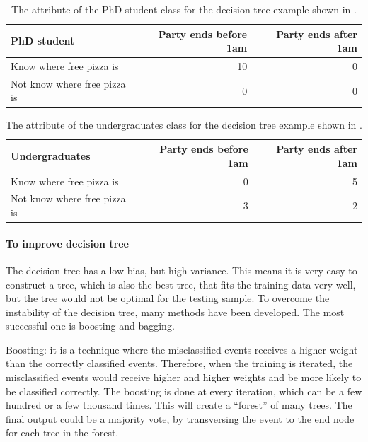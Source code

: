 \begin{table}[!tbp]\centering

\begin{tabular}{lrr}
\hline \hline
PhD student & Party ends before 1am  & Party ends after 1am\\
\hline
Know where free pizza is & 10 & 0 \\
Not know where free pizza is & 0 & 0 \\
\hline \hline
\end{tabular}
\caption
{The attribute of the PhD student class for the decision tree example shown in .}
\label{tab:doubleHiggsDecisionTreeComic}
\end{table}
\begin{table}[!tbp]\centering

\begin{tabular}{lrr}
\hline \hline
Undergraduates & Party ends before 1am  & Party ends after 1am\\
\hline
Know where free pizza is & 0 & 5 \\
Not know where free pizza is & 3 & 2 \\
\hline \hline
\end{tabular}
\caption
{The attribute of  the undergraduates class for the decision tree example shown in .}
\label{tab:doubleHiggsDecisionTreeComic2}
\end{table}


\paragraph{To improve decision tree}

The decision tree has a low bias, but high variance. This means it is very easy to construct a tree, which is also the best tree, that fits the training data very well, but the tree would not be optimal for the testing sample. To overcome the instability of the decision tree, many methods have been developed. The most successful one is boosting and bagging.

Boosting: it is a technique where the misclassified events receives a higher weight than the correctly classified events. Therefore, when the training is iterated, the misclassified events would receive higher and higher weights and be more likely to be classified correctly. The boosting is done at every iteration, which can be a few hundred or a few thousand times. This will create a ``forest'' of many trees. The final output could be a majority vote, by transversing the event to the end node for each tree in the forest.

